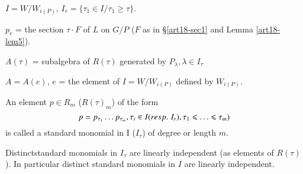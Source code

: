\noindent
$I = W/ W_{i(P)}$, $I_r = \{\tau_1 \in I/ \tau_1 \geqslant \tau\}$.

\noindent
$p_r$ = the section $\tau \cdot F$ of $L$ on $G/P$ ($F$ as in \S \ref{art18-sec1} and Lemma \ref{art18-lem5}).

\noindent 
$A(\tau)$ = subalgebra of $R(\tau)$ generated by $P_\lambda,\lambda \in I_\tau$

\noindent
$A = A(e)$, $e$ = the element of $I = W/W_{i(P)}$ defined by $W_{i(P)}$.

\begin{definition}\label{art18-defi2}
An element $p \in R_m$ (\resp $R(\tau)_m$) of the form 
$$
p = p_{\tau_1} \ldots p_{\tau_m}, \tau_i \in I ({resp.}\kern.3em I_r), \tau_1 \leqslant \ldots \leqslant \tau_m)
$$  
is called a standard monomial in I (\resp $I_\tau$) of  degree or length $m$.
\end{definition}

\begin{prop}\label{art18-prop1}
Distinct\pageoriginale standard monomials in $I_\tau$ are linearly independent (as elements of $R(\tau)$). In particular distinct standard monomials in $I$ are linearly independent.
\end{prop}

